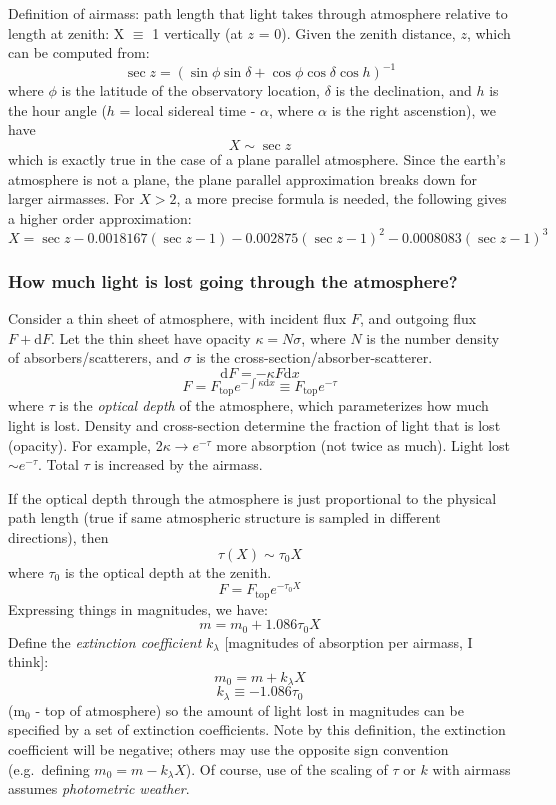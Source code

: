\documentclass[12pt]{article}
\begin{document}
Definition of airmass: path length that light takes through atmosphere
relative to length at zenith: X $\equiv$ 1 vertically (at $z$ = 0).
Given the zenith distance, $z$, which can be computed from:
    $$ \sec z = \left(\sin\phi\sin\delta +
                 \cos\phi\cos\delta\cos h\right)^{-1} $$
where $\phi$ is the latitude of the observatory location,
$\delta$ is the declination, and $h$ is
the hour angle ($h$ = local sidereal time - $\alpha$, where $\alpha$ is
the right ascenstion), we have
    $$ X \sim \sec z $$
which is exactly true in the case of a plane parallel atmosphere. Since
the earth's atmosphere is not a plane, the plane parallel
approximation breaks down for larger airmasses. For $X>2$, a more
precise formula is needed, the following gives a higher order
approximation:
    $$ X = \sec z - 0.0018167(\sec z-1)
                  - 0.002875(\sec z-1)^2
                  - 0.0008083(\sec z-1)^3 $$

\subsubsection{How much light is lost going through the atmosphere?}
Consider a thin sheet of atmosphere, with incident flux $F$, and
outgoing flux $F + \textrm{d}F$.
Let the thin sheet have opacity $\kappa = N\sigma$,
where $N$ is the number density of absorbers/scatterers, and
$\sigma$ is the cross-section/absorber-scatterer.
    $$ \textrm{d}F = -\kappa F \textrm{d}x $$
    $$ F = F_{\textrm{top}}e^{-\int\kappa\textrm{d}x}
         \equiv F_{\textrm{top}}e^{-\tau} $$
where $\tau$ is the \emph{optical depth} of the atmosphere, which
parameterizes how much light is lost.
\textcolor{myBlue}{Density and cross-section determine the fraction
    of light that is lost (opacity). For example, 2$\kappa \rightarrow
    e^{-\tau}$ more absorption (not twice as much).
    Light lost $\sim e^{-\tau}$.
    Total $\tau$ is increased by the airmass.
}

If the optical depth through the atmosphere is just proportional to
the physical path length (true if same atmospheric structure is
sampled in different directions), then
    $$ \tau(X) \sim \tau_0X $$
where $\tau_0$ is the optical depth at the zenith.
    $$ F = F_{\textrm{top}}e^{-\tau_0X} $$
Expressing things in magnitudes, we have:
    $$ m = m_0 + 1.086\tau_0X $$
Define the \emph{extinction coefficient} $k_{\lambda}$ [magnitudes of
absorption per airmass, I think]:
    $$ m_0 = m + k_{\lambda}X $$
    $$ k_{\lambda} \equiv -1.086\tau_0 $$
(m$_0$ - top of atmosphere)
so the amount of light lost in magnitudes can be specified by a set of
extinction coefficients. Note by this definition, the extinction
coefficient will be negative; others may use the opposite sign
convention (e.g.\ defining $m_0 = m - k_{\lambda}X$). Of
course, use of the scaling of $\tau$ or $k$ with airmass assumes
\emph{photometric weather}.
\end{document}

